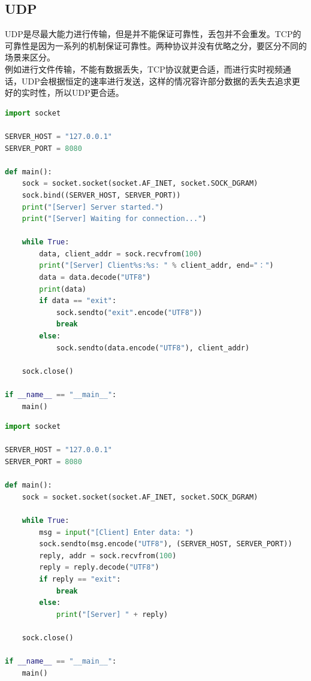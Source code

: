 \vspace{0.5cm}

\subsection{UDP}

UDP是尽最大能力进行传输，但是并不能保证可靠性，丢包并不会重发。TCP的可靠性是因为一系列的机制保证可靠性。两种协议并没有优略之分，要区分不同的场景来区分。\\

例如进行文件传输，不能有数据丢失，TCP协议就更合适，而进行实时视频通话，UDP会根据恒定的速率进行发送，这样的情况容许部分数据的丢失去追求更好的实时性，所以UDP更合适。\\


\begin{lstlisting}[language=Python, title=udp\_server.py]
import socket

SERVER_HOST = "127.0.0.1"
SERVER_PORT = 8080

def main():
    sock = socket.socket(socket.AF_INET, socket.SOCK_DGRAM)
    sock.bind((SERVER_HOST, SERVER_PORT))
    print("[Server] Server started.")
    print("[Server] Waiting for connection...")

    while True:
        data, client_addr = sock.recvfrom(100)
        print("[Server] Client%s:%s: " % client_addr, end="：")
        data = data.decode("UTF8")
        print(data)
        if data == "exit":
            sock.sendto("exit".encode("UTF8"))
            break
        else:
            sock.sendto(data.encode("UTF8"), client_addr)
    
    sock.close()

if __name__ == "__main__":
    main()
\end{lstlisting}

\begin{lstlisting}[language=Python, title=udp\_client.py]
import socket

SERVER_HOST = "127.0.0.1"
SERVER_PORT = 8080

def main():
    sock = socket.socket(socket.AF_INET, socket.SOCK_DGRAM)

    while True:     
        msg = input("[Client] Enter data: ")
        sock.sendto(msg.encode("UTF8"), (SERVER_HOST, SERVER_PORT))
        reply, addr = sock.recvfrom(100)
        reply = reply.decode("UTF8")
        if reply == "exit":
            break
        else:
            print("[Server] " + reply)

    sock.close()

if __name__ == "__main__":
    main()
\end{lstlisting}

\newpage